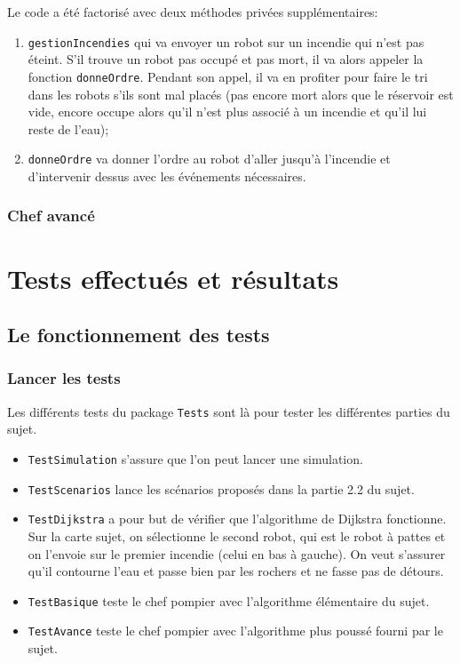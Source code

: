 \documentclass[a4paper,8pt]{article} %
\begin{document}
Le code a été factorisé avec deux méthodes privées supplémentaires:
\begin{enumerate}
    \item \texttt{gestionIncendies} qui va envoyer un robot sur un incendie qui n'est pas éteint. S'il trouve un robot pas occupé et pas mort,
    il va alors appeler la fonction \texttt{donneOrdre}. Pendant son appel, il va en profiter pour faire le tri dans les robots s'ils sont
    mal placés (pas encore mort alors que le réservoir est vide, encore occupe alors qu'il n'est plus associé à un incendie et qu'il lui reste
    de l'eau);
    \item \texttt{donneOrdre} va donner l'ordre au robot d'aller jusqu'à l'incendie et d'intervenir dessus avec les événements nécessaires.
\end{enumerate}

\subsubsection{Chef avancé}
\section{Tests effectués et résultats}
\subsection{Le fonctionnement des tests}
\subsubsection{Lancer les tests}
Les différents tests du package \texttt{Tests} sont là pour tester les différentes parties du sujet.
\begin{itemize}
    \item \texttt{TestSimulation} s'assure que l'on peut lancer une simulation.
    \item \texttt{TestScenarios} lance les scénarios proposés dans la partie 2.2 du sujet.
    \item \texttt{TestDijkstra} a pour but de vérifier que l'algorithme de Dijkstra fonctionne. Sur la carte sujet, 
    on sélectionne le second robot, qui est le robot à pattes et on l'envoie sur le premier incendie (celui en bas à gauche).
    On veut s'assurer qu'il contourne l'eau et passe bien par les rochers et ne fasse pas de détours.
    \item \texttt{TestBasique} teste le chef pompier avec l'algorithme élémentaire du sujet.
    \item \texttt{TestAvance} teste le chef pompier avec l'algorithme plus poussé fourni par le sujet.
\end{itemize}
\end{document}
